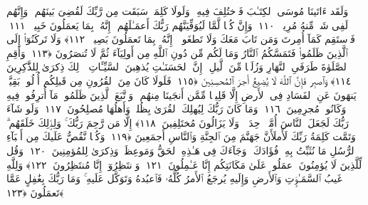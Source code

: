  وَلَقَد ءَاتَينَا مُوسَى ٱلكِتَـٰبَ فَٱختُلِفَ فِيهِ ۚ وَلَولَا كَلِمَةٌۭ سَبَقَت مِن رَّبِّكَ لَقُضِىَ بَينَهُم ۚ وَإِنَّهُم لَفِى شَكٍّۢ مِّنهُ مُرِيبٍۢ ﴿١١٠﴾
 وَإِنَّ كُلًّۭا لَّمَّا لَيُوَفِّيَنَّهُم رَبُّكَ أَعمَـٰلَهُم ۚ إِنَّهُۥ بِمَا يَعمَلُونَ خَبِيرٌۭ ﴿١١١﴾
 فَٱستَقِم كَمَآ أُمِرتَ وَمَن تَابَ مَعَكَ وَلَا تَطغَوا۟ ۚ إِنَّهُۥ بِمَا تَعمَلُونَ بَصِيرٌۭ ﴿١١٢﴾
 وَلَا تَركَنُوٓا۟ إِلَى ٱلَّذِينَ ظَلَمُوا۟ فَتَمَسَّكُمُ ٱلنَّارُ وَمَا لَكُم مِّن دُونِ ٱللَّهِ مِن أَولِيَآءَ ثُمَّ لَا تُنصَرُونَ ﴿١١٣﴾
 وَأَقِمِ ٱلصَّلَوٰةَ طَرَفَىِ ٱلنَّهَارِ وَزُلَفًۭا مِّنَ ٱلَّيلِ ۚ إِنَّ ٱلحَسَنَـٰتِ يُذهِبنَ ٱلسَّيِّـَٔاتِ ۚ ذَٟلِكَ ذِكرَىٰ لِلذَّٰكِرِينَ ﴿١١٤﴾
 وَٱصبِر فَإِنَّ ٱللَّهَ لَا يُضِيعُ أَجرَ ٱلمُحسِنِينَ ﴿١١٥﴾
 فَلَولَا كَانَ مِنَ ٱلقُرُونِ مِن قَبلِكُم أُو۟لُوا۟ بَقِيَّةٍۢ يَنهَونَ عَنِ ٱلفَسَادِ فِى ٱلأَرضِ إِلَّا قَلِيلًۭا مِّمَّن أَنجَينَا مِنهُم ۗ وَٱتَّبَعَ ٱلَّذِينَ ظَلَمُوا۟ مَآ أُترِفُوا۟ فِيهِ وَكَانُوا۟ مُجرِمِينَ ﴿١١٦﴾
 وَمَا كَانَ رَبُّكَ لِيُهلِكَ ٱلقُرَىٰ بِظُلمٍۢ وَأَهلُهَا مُصلِحُونَ ﴿١١٧﴾
 وَلَو شَآءَ رَبُّكَ لَجَعَلَ ٱلنَّاسَ أُمَّةًۭ وَٟحِدَةًۭ ۖ وَلَا يَزَالُونَ مُختَلِفِينَ ﴿١١٨﴾
 إِلَّا مَن رَّحِمَ رَبُّكَ ۚ وَلِذَٟلِكَ خَلَقَهُم ۗ وَتَمَّت كَلِمَةُ رَبِّكَ لَأَملَأَنَّ جَهَنَّمَ مِنَ ٱلجِنَّةِ وَٱلنَّاسِ أَجمَعِينَ ﴿١١٩﴾
 وَكُلًّۭا نَّقُصُّ عَلَيكَ مِن أَنۢبَآءِ ٱلرُّسُلِ مَا نُثَبِّتُ بِهِۦ فُؤَادَكَ ۚ وَجَآءَكَ فِى هَـٰذِهِ ٱلحَقُّ وَمَوعِظَةٌۭ وَذِكرَىٰ لِلمُؤمِنِينَ ﴿١٢٠﴾
 وَقُل لِّلَّذِينَ لَا يُؤمِنُونَ ٱعمَلُوا۟ عَلَىٰ مَكَانَتِكُم إِنَّا عَـٰمِلُونَ ﴿١٢١﴾
 وَٱنتَظِرُوٓا۟ إِنَّا مُنتَظِرُونَ ﴿١٢٢﴾
 وَلِلَّهِ غَيبُ ٱلسَّمَـٰوَٟتِ وَٱلأَرضِ وَإِلَيهِ يُرجَعُ ٱلأَمرُ كُلُّهُۥ فَٱعبُدهُ وَتَوَكَّل عَلَيهِ ۚ وَمَا رَبُّكَ بِغَٰفِلٍ عَمَّا تَعمَلُونَ ﴿١٢٣﴾
 
